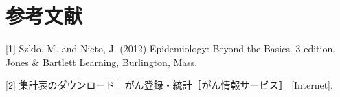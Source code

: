 \documentclass[11pt,]{article}
\begin{document}
\section*{参考文献}

\hypertarget{refs}{}
\hypertarget{ref-szkloux5fepidemiology:ux5f2012}{}
{[}1{]} Szklo, M. and Nieto, J. (2012) Epidemiology: Beyond the Basics.
3 edition. Jones \& Bartlett Learning, Burlington, Mass.

\hypertarget{ref-rikan}{}
{[}2{]} 集計表のダウンロード｜がん登録・統計［がん情報サービス］
{[}Internet{]}.
\end{document}

